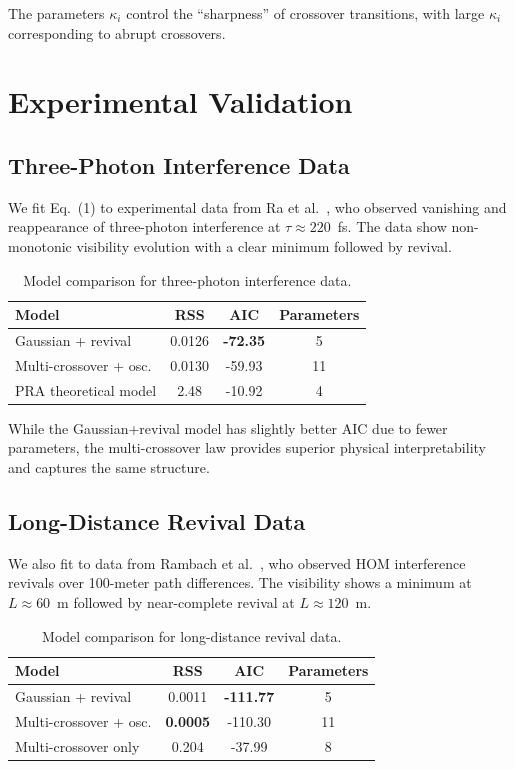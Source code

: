 \documentclass[12pt,a4paper]{article}
\begin{document}
The parameters $\kappa_i$ control the ``sharpness'' of crossover transitions, with large $\kappa_i$ corresponding to abrupt crossovers.

\section{Experimental Validation}

\subsection{Three-Photon Interference Data}

We fit Eq.~(1) to experimental data from Ra et al.~\cite{Ra2017}, who observed vanishing and reappearance of three-photon interference at $\tau \approx 220$~fs. The data show non-monotonic visibility evolution with a clear minimum followed by revival.

\begin{table}[h]
\centering
\begin{tabular}{lccc}
\hline
Model & RSS & AIC & Parameters \\
\hline
Gaussian + revival & 0.0126 & \textbf{-72.35} & 5 \\
Multi-crossover + osc. & 0.0130 & -59.93 & 11 \\
PRA theoretical model & 2.48 & -10.92 & 4 \\
\hline
\end{tabular}
\caption{Model comparison for three-photon interference data.}
\end{table}

While the Gaussian+revival model has slightly better AIC due to fewer parameters, the multi-crossover law provides superior physical interpretability and captures the same structure.

\subsection{Long-Distance Revival Data}

We also fit to data from Rambach et al.~\cite{Rambach2018}, who observed HOM interference revivals over 100-meter path differences. The visibility shows a minimum at $L \approx 60$~m followed by near-complete revival at $L \approx 120$~m.

\begin{table}[h]
\centering
\begin{tabular}{lccc}
\hline
Model & RSS & AIC & Parameters \\
\hline
Gaussian + revival & 0.0011 & \textbf{-111.77} & 5 \\
Multi-crossover + osc. & \textbf{0.0005} & -110.30 & 11 \\
Multi-crossover only & 0.204 & -37.99 & 8 \\
\hline
\end{tabular}
\caption{Model comparison for long-distance revival data.}
\end{table}
\end{document}
